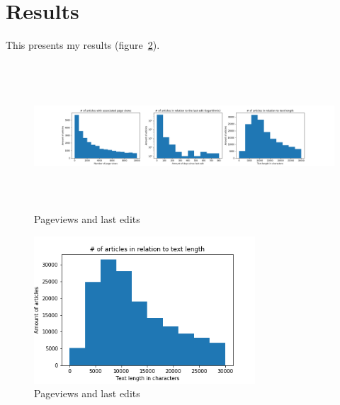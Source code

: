 \section{Results}
\label{ch:results}

This presents my results (figure~\ref{fig:descriptive_one}).
\begin{figure}[h]
  	\includegraphics[height=5.5cm]{img/descriptive_one}
  	\caption{Pageviews and last edits}
	\label{fig:descriptive_one}
\end{figure}

\begin{figure}[h]
  	\includegraphics[height=5.5cm]{img/descriptive_two}
  	\caption{Pageviews and last edits}
	\label{fig:descriptive_one}
\end{figure}






